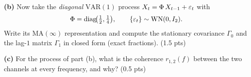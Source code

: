 \documentclass[11pt]{article}
\DeclareMathOperator{\diag}{diag}
\begin{document}
\textbf{(b)} Now take the \emph{diagonal} $\mathrm{VAR}(1)$ process $X_t=\Phi\,X_{t-1}+\varepsilon_t$ with
\[
\Phi=\diag\!\bigl(\tfrac12,\tfrac14\bigr),\qquad
\{\eps_t\}\sim\mathrm{WN}(0,I_2).
\]
Write its $\mathrm{MA}(\infty)$ representation and compute the stationary covariance $\Gamma_0$ and the lag-$1$ matrix $\Gamma_1$ in closed form (exact fractions). \hfill(1.5 pts)

\textbf{(c)} For the process of part (b), what is the coherence $r_{1,2}(f)$ between the two channels at every frequency, and why? \hfill(0.5 pts)
\answerpage
\end{document}
